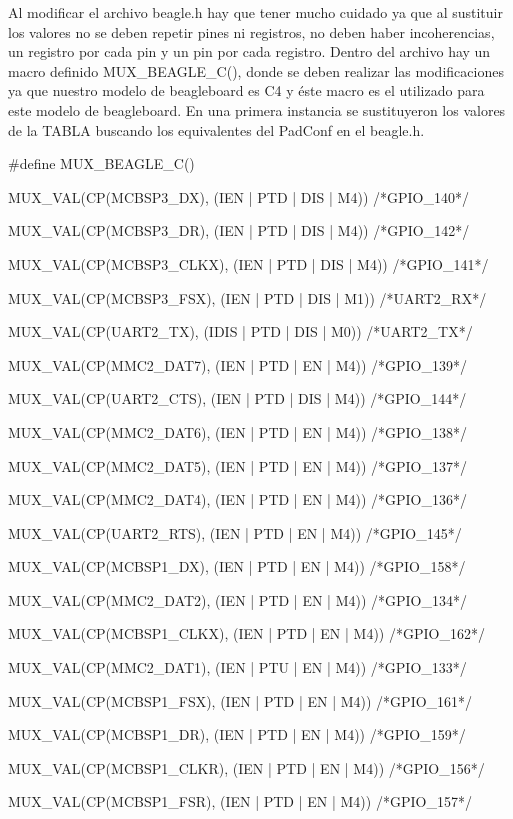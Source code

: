 Al modificar el archivo beagle.h hay que tener mucho cuidado ya que al sustituir los valores no se deben repetir pines ni registros, no deben haber incoherencias, un registro por cada pin y un pin por cada registro. 
Dentro del archivo hay un macro definido MUX\_BEAGLE\_C(), donde se deben realizar las modificaciones ya que nuestro modelo de beagleboard es C4 y éste macro es el utilizado para este modelo de beagleboard.
En una primera instancia se sustituyeron los valores de la TABLA buscando los equivalentes del 
PadConf en el beagle.h. 

\#define MUX\_BEAGLE\_C() \ 

MUX\_VAL(CP(MCBSP3\_DX),	(IEN  | PTD | DIS | M4)) /*GPIO\_140*/\ 

MUX\_VAL(CP(MCBSP3\_DR),	(IEN  | PTD | DIS | M4)) /*GPIO\_142*/\ 

MUX\_VAL(CP(MCBSP3\_CLKX),	(IEN  | PTD | DIS | M4)) /*GPIO\_141*/\ 

MUX\_VAL(CP(MCBSP3\_FSX),	(IEN  | PTD | DIS | M1)) /*UART2\_RX*/\ 

MUX\_VAL(CP(UART2\_TX),		(IDIS | PTD | DIS | M0)) /*UART2\_TX*/\ 

MUX\_VAL(CP(MMC2\_DAT7),	(IEN  | PTD | EN  | M4)) /*GPIO\_139*/\ 

MUX\_VAL(CP(UART2\_CTS),	(IEN  | PTD | DIS | M4)) /*GPIO\_144*/\ 

MUX\_VAL(CP(MMC2\_DAT6),	(IEN  | PTD | EN  | M4)) /*GPIO\_138*/\ 

MUX\_VAL(CP(MMC2\_DAT5),	(IEN  | PTD | EN  | M4)) /*GPIO\_137*/\ 

MUX\_VAL(CP(MMC2\_DAT4),	(IEN  | PTD | EN  | M4)) /*GPIO\_136*/\ 

MUX\_VAL(CP(UART2\_RTS),	(IEN  | PTD | EN  | M4)) /*GPIO\_145*/\ 

MUX\_VAL(CP(MCBSP1\_DX),	(IEN  | PTD | EN  | M4)) /*GPIO\_158*/\ 

MUX\_VAL(CP(MMC2\_DAT2),	(IEN  | PTD | EN  | M4)) /*GPIO\_134*/\ 

MUX\_VAL(CP(MCBSP1\_CLKX),	(IEN  | PTD | EN  | M4)) /*GPIO\_162*/\ 

MUX\_VAL(CP(MMC2\_DAT1),	(IEN  | PTU | EN  | M4)) /*GPIO\_133*/\ 

MUX\_VAL(CP(MCBSP1\_FSX),	(IEN  | PTD | EN  | M4)) /*GPIO\_161*/\ 

MUX\_VAL(CP(MCBSP1\_DR),	(IEN  | PTD | EN  | M4)) /*GPIO\_159*/\ 

MUX\_VAL(CP(MCBSP1\_CLKR),	(IEN  | PTD | EN  | M4)) /*GPIO\_156*/\ 

MUX\_VAL(CP(MCBSP1\_FSR),	(IEN  | PTD | EN  | M4)) /*GPIO\_157*/\ 

